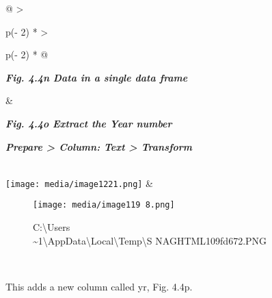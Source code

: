 \documentclass[
  letterpaper,
  DIV=11,
  numbers=noendperiod]{scrreprt}
\begin{document}
\begin{longtable}[]{@{}
  >{\raggedright\arraybackslash}p{(\columnwidth - 2\tabcolsep) * }
  >{\raggedright\arraybackslash}p{(\columnwidth - 2\tabcolsep) * }@{}}
\toprule\noalign{}
\begin{minipage}[b]{\linewidth}\raggedright
\textbf{\emph{Fig. 4.4n Data in a single data frame}}
\end{minipage} & \begin{minipage}[b]{\linewidth}\raggedright
\textbf{\emph{Fig. 4.4o Extract the Year number}}

\textbf{\emph{Prepare \textgreater{} Column: Text \textgreater{}
Transform}}
\end{minipage} \\
\midrule\noalign{}
\endhead
\bottomrule\noalign{}
\endlastfoot
\texttt{[image: media/image1221.png]}
& \begin{minipage}[t]{\linewidth}\raggedright
\begin{figure}[H]

{\centering \texttt{[image: media/image119 8.png]}

}

\caption{C:\textbackslash Users\\
\ROGERS\textasciitilde1\textbackslash AppData\textbackslash Local\textbackslash Temp\textbackslash S
NAGHTML109fd672.PNG}

\end{figure}%
\end{minipage} \\
\end{longtable}

This adds a new column called yr, Fig. 4.4p.
\end{document}
